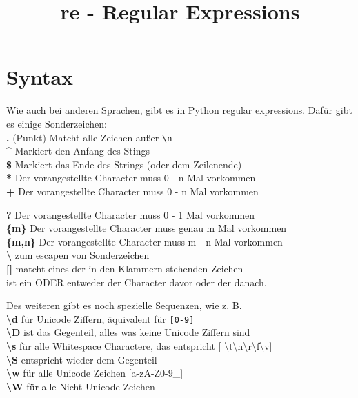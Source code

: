 \documentclass[ignorenonframetext,]{beamer}
\title{re - Regular Expressions}
\date{}
\begin{document}
\frame{\titlepage}

\section{Syntax}\label{syntax}

\begin{frame}

Wie auch bei anderen Sprachen, gibt es in Python regular expressions.
Dafür gibt es einige Sonderzeichen:\\
\textbf{.} (Punkt) Matcht alle Zeichen außer
\texttt{\textbackslash{}n}\\
\textbf{\^{}} Markiert den Anfang des Stings\\
\textbf{\$} Markiert das Ende des Strings (oder dem Zeilenende)\\
\textbf{*} Der vorangestellte Character muss 0 - n Mal vorkommen\\
\textbf{+} Der vorangestellte Character muss 0 - n Mal vorkommen

\end{frame}

\begin{frame}

\textbf{?} Der vorangestellte Character muss 0 - 1 Mal vorkommen\\
\textbf{\{m\}} Der vorangestellte Character muss genau m Mal vorkommen\\
\textbf{\{m,n\}} Der vorangestellte Character muss m - n Mal vorkommen\\
\textbf{\textbackslash{}} zum escapen von Sonderzeichen\\
\textbf{{[}{]}} matcht eines der in den Klammern stehenden Zeichen\\
\textbf{\textbar{}} ist ein ODER entweder der Character davor oder der
danach.

\end{frame}

\begin{frame}

Des weiteren gibt es noch spezielle Sequenzen, wie z. B.\\
\textbf{\textbackslash{}d} für Unicode Ziffern, äquivalent für
\texttt{{[}0-9{]}}\\
\textbf{\textbackslash{}D} ist das Gegenteil, alles was keine Unicode
Ziffern sind\\
\textbf{\textbackslash{}s} für alle Whitespace Charactere, das
entspricht {[}
\textbackslash{}t\textbackslash{}n\textbackslash{}r\textbackslash{}f\textbackslash{}v{]}\\
\textbf{\textbackslash{}S} entspricht wieder dem Gegenteil\\
\textbf{\textbackslash{}w} für alle Unicode Zeichen {[}a-zA-Z0-9\_{]}\\
\textbf{\textbackslash{}W} für alle Nicht-Unicode Zeichen

\end{frame}
\end{document}
